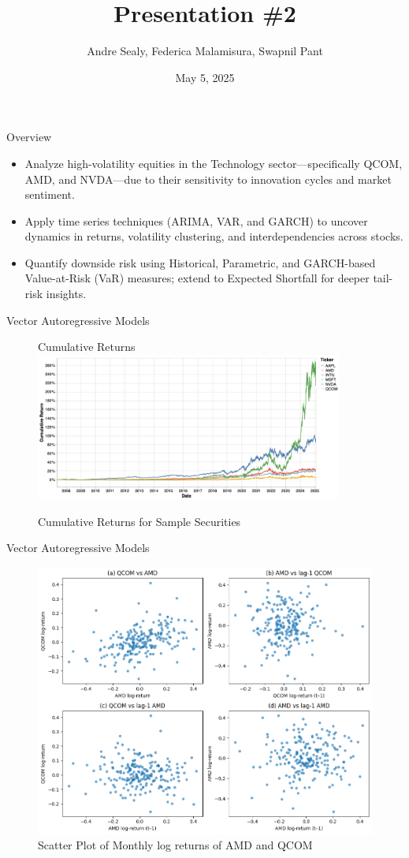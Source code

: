 \documentclass{beamer}[9pt]
\title{Presentation \#2}
\author{Andre Sealy, Federica Malamisura, Swapnil Pant}
\institute{Stevens Institute of Technology}
\date{May 5, 2025}
\begin{document}
	
	\frame{\titlepage}
	
	\begin{frame}{Overview}
		\begin{itemize}
			\item Analyze high-volatility equities in the Technology sector—specifically QCOM, AMD, and NVDA—due to their sensitivity to innovation cycles and market sentiment.
			\item Apply time series techniques (ARIMA, VAR, and GARCH) to uncover dynamics in returns, volatility clustering, and interdependencies across stocks.
			\item Quantify downside risk using Historical, Parametric, and GARCH-based Value-at-Risk (VaR) measures; extend to Expected Shortfall for deeper tail-risk insights.
		\end{itemize}
	\end{frame}
	

\begin{frame}{Vector Autoregressive Models}
	\begin{figure}{Cumulative Returns}
		\centering
		\includegraphics[width=0.9\textwidth]{plots/sample_stocks.png} %
		\caption{Cumulative Returns for Sample Securities}
	\end{figure}
\end{frame}

\begin{frame}{Vector Autoregressive Models}
	\begin{figure}[!h]
		\centering
		\includegraphics[width=0.8\linewidth]{plots/amd_qcom_scatter.png}
		\caption{Scatter Plot of Monthly log returns of AMD and QCOM}
		\label{fig:amd_qcom_scatter}
	\end{figure}
\end{frame}
\end{document}
